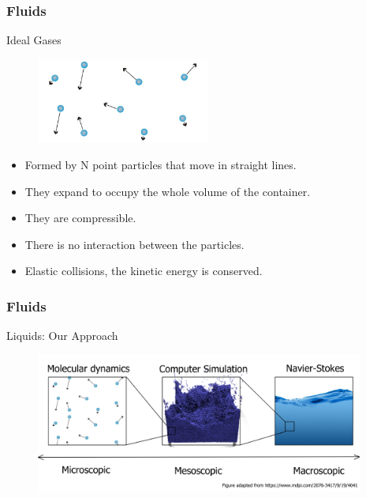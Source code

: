 \documentclass[]{beamer}
\begin{document}
\begin{frame}

\frametitle{Fluids}
\textcolor{mypink1}{Ideal Gases}

\vspace{5mm}

\begin{figure}[h!]
  \begin{center}
    \includegraphics[height=1.1in]{images2/0.jpg}
    \label{0}
  \end{center}
\end{figure}

\begin{itemize}
\item Formed by N point particles that move in straight lines.
\pause
\item They expand to occupy the whole volume of the container.
\pause
\item  They are compressible. 
\pause
\item There is no interaction between the particles.
\pause
\item Elastic collisions, the kinetic energy is conserved. 
\end{itemize}



  
  \end{frame}


\begin{frame}

    \frametitle{Fluids}
    \textcolor{mypink1}{Liquids: Our Approach}
    
    \begin{figure}[h!]
      \begin{center}
        \includegraphics[height=1.8in]{images2/fluids_dimensions.jpg}
        \label{fd}
      \end{center}
    \end{figure}
    
\end{frame}
    
\end{document}
